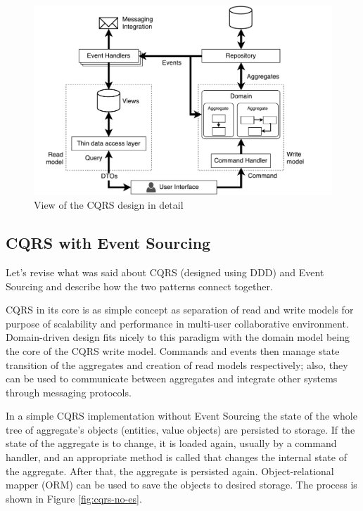 \documentclass{book}
\begin{document}
\begin{figure}[h!]
\begin{center}
\includegraphics[width=0.84\columnwidth]{figures/cqrs-detail/cqrs-detail}
\caption{View of the CQRS design in detail%
}
\end{center}
\end{figure}

\subsection{CQRS with Event Sourcing}\label{cqrs-with-event-sourcing}

Let's revise what was said about CQRS (designed using DDD) and Event
Sourcing and describe how the two patterns connect together.

CQRS in its core is as simple concept as separation of read and write
models for purpose of scalability and performance in multi-user
collaborative environment. Domain-driven design fits nicely to this
paradigm with the domain model being the core of the CQRS write model.
Commands and events then manage state transition of the aggregates and
creation of read models respectively; also, they can be used to
communicate between aggregates and integrate other systems through
messaging protocols.

In a simple CQRS implementation without Event Sourcing the state of the
whole tree of aggregate's objects (entities, value objects) are
persisted to storage. If the state of the aggregate is to change, it is
loaded again, usually by a command handler, and an appropriate method is
called that changes the internal state of the aggregate. After that, the
aggregate is persisted again. Object-relational mapper (ORM) can be used
to save the objects to desired storage. The process is shown in Figure
\ref{fig:cqrs-no-es}.
\end{document}
